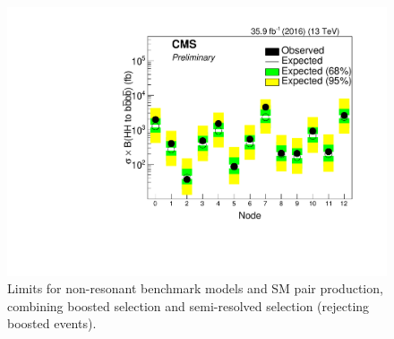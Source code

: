 \begin{figure}[thb!]
\begin{center}
\includegraphics[scale=0.5]{F5/nonreslim.pdf}
\end{center}
\caption{Limits for non-resonant benchmark models and SM pair production, combining boosted selection and semi-resolved selection (rejecting boosted events).}
\label{fig:1p12p1NR}
\end{figure}

